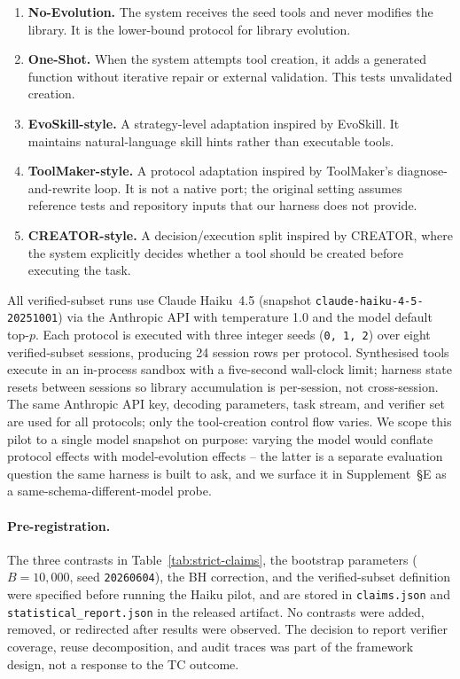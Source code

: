 \documentclass[sigconf,anonymous,review,natbib=false]{acmart}
\begin{document}
\begin{enumerate}[leftmargin=1.2em]
  \item \textbf{No-Evolution.} The system receives the seed tools and never modifies the library. It is the lower-bound protocol for library evolution.
  \item \textbf{One-Shot.} When the system attempts tool creation, it adds a generated function without iterative repair or external validation. This tests unvalidated creation.
  \item \textbf{EvoSkill-style.} A strategy-level adaptation inspired by EvoSkill. It maintains natural-language skill hints rather than executable tools.
  \item \textbf{ToolMaker-style.} A protocol adaptation inspired by ToolMaker's diagnose-and-rewrite loop. It is not a native port; the original setting assumes reference tests and repository inputs that our harness does not provide.
  \item \textbf{CREATOR-style.} A decision/execution split inspired by CREATOR, where the system explicitly decides whether a tool should be created before executing the task.
\end{enumerate}

All verified-subset runs use Claude Haiku~4.5 (snapshot \texttt{claude-haiku-4-5-20251001}) via the Anthropic API with temperature 1.0 and the model default top-$p$. Each protocol is executed with three integer seeds (\texttt{0, 1, 2}) over eight verified-subset sessions, producing 24 session rows per protocol. Synthesised tools execute in an in-process sandbox with a five-second wall-clock limit; harness state resets between sessions so library accumulation is per-session, not cross-session. The same Anthropic API key, decoding parameters, task stream, and verifier set are used for all protocols; only the tool-creation control flow varies. We scope this pilot to a single model snapshot on purpose: varying the model would conflate protocol effects with model-evolution effects -- the latter is a separate evaluation question the same harness is built to ask, and we surface it in Supplement~\S E as a same-schema-different-model probe.

\paragraph{Pre-registration.}
The three contrasts in Table~\ref{tab:strict-claims}, the bootstrap parameters ($B{=}10{,}000$, seed \texttt{20260604}), the BH correction, and the verified-subset definition were specified before running the Haiku pilot, and are stored in \texttt{claims.json} and \texttt{statistical\_report.json} in the released artifact. No contrasts were added, removed, or redirected after results were observed. The decision to report verifier coverage, reuse decomposition, and audit traces was part of the framework design, not a response to the TC outcome.
\end{document}
